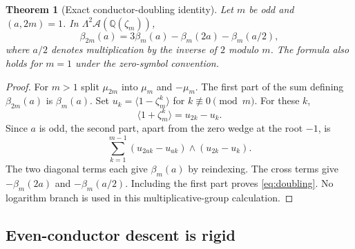 \documentclass[11pt]{article}
\numberwithin{equation}{section}
\newtheorem{theorem}{Theorem}[section]
\theoremstyle{definition}
\theoremstyle{remark}
\newcommand{\Q}{\mathbb Q}
\newcommand{\A}{\mathcal A}
\newcommand{\cl}[1]{\langle #1\rangle}
\begin{document}
\begin{theorem}[Exact conductor-doubling identity]\label{thm:doubling}
Let $m$ be odd and $(a,2m)=1$. In
$\Lambda^2\A(\Q(\zeta_m))$,
\begin{equation}\label{eq:doubling}
 \beta_{2m}(a)=3\beta_m(a)-\beta_m(2a)-\beta_m(a/2),
\end{equation}
where $a/2$ denotes multiplication by the inverse of $2$ modulo $m$.
The formula also holds for $m=1$ under the zero-symbol convention.
\end{theorem}
\begin{proof}
For $m>1$ split $\mu_{2m}$ into $\mu_m$ and $-\mu_m$. The first
part of the sum defining $\beta_{2m}(a)$ is $\beta_m(a)$. Set
$u_k=\cl{1-\zeta_m^k}$ for $k\not\equiv0\pmod m$. For these $k$,
\[
 \cl{1+\zeta_m^k}=u_{2k}-u_k.
\]
Since $a$ is odd, the second part, apart from the zero wedge at the root
$-1$, is
\[
 \sum_{k=1}^{m-1}(u_{2ak}-u_{ak})\wedge(u_{2k}-u_k).
\]
The two diagonal terms each give $\beta_m(a)$ by reindexing. The cross
terms give $-\beta_m(2a)$ and $-\beta_m(a/2)$. Including the first
part proves \eqref{eq:doubling}. No logarithm branch is used in this
multiplicative-group calculation.
\end{proof}

\subsection{Even-conductor descent is rigid}
\end{document}
